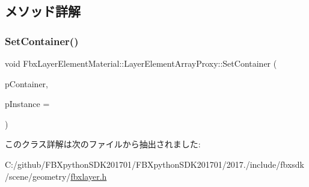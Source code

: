 \subsection{メソッド詳解}
\mbox{\label{class_fbx_layer_element_material_1_1_layer_element_array_proxy_a8772c8cf8d76dbdcb5d4019ef29d6af0}} 
\subsubsection{\texorpdfstring{Set\+Container()}{SetContainer()}}
{\footnotesize\ttfamily void Fbx\+Layer\+Element\+Material\+::\+Layer\+Element\+Array\+Proxy\+::\+Set\+Container (\begin{DoxyParamCaption}\item[{\hyperlink{class_fbx_layer_container}{Fbx\+Layer\+Container} $\ast$}]{p\+Container,  }\item[{int}]{p\+Instance = {} }\end{DoxyParamCaption})}



このクラス詳解は次のファイルから抽出されました\+:\begin{DoxyCompactItemize}
\item 
C\+:/github/\+F\+B\+Xpython\+S\+D\+K201701/\+F\+B\+Xpython\+S\+D\+K201701/2017./include/fbxsdk/scene/geometry/\hyperlink{fbxlayer_8h}{fbxlayer.\+h}\end{DoxyCompactItemize}

